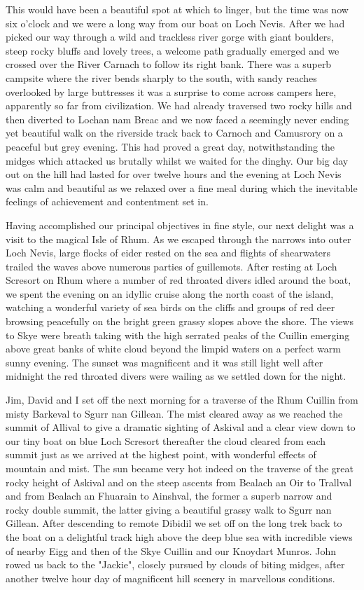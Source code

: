 \documentclass[a5paper,openany,font 10pt]{scrbook}
\begin{document}
This would have been a beautiful spot at which to linger,
but the time was now six o'clock and we were a long way from our
boat on Loch Nevis. After we had picked our way through a wild
and trackless river gorge with giant boulders, steep rocky bluffs
and lovely trees, a welcome path gradually emerged and we crossed
over the River Carnach to follow its right bank. There was a
superb campsite where the river bends sharply to the south, with
sandy reaches overlooked by large buttresses  it was a surprise
to come across campers here, apparently so far from civilization.
We had already traversed two rocky hills and then diverted to
Lochan nam Breac and we now faced a seemingly never ending yet
beautiful walk on the riverside track back to Carnoch and
Camusrory on a peaceful but grey evening. This had proved a great
day, notwithstanding the midges which attacked us brutally whilst
we waited for the dinghy. Our big day out on the hill had lasted
for over twelve hours and the evening at Loch Nevis was calm and
beautiful as we relaxed over a fine meal during which the
inevitable feelings of achievement and contentment set in.

Having accomplished our principal objectives in fine style,
our next delight was a visit to the magical Isle of Rhum. As we
escaped through the narrows into outer Loch Nevis, large flocks
of eider rested on the sea and flights of shearwaters trailed the
waves above numerous parties of guillemots. After resting at Loch
Scresort on Rhum where a number of red throated divers idled
around the boat, we spent the evening on an idyllic cruise along
the north coast of the island, watching a wonderful variety of
sea birds on the cliffs and groups of red deer browsing
peacefully on the bright green grassy slopes above the shore. The
views to Skye were breath taking with the high serrated peaks of
the Cuillin emerging above great banks of white cloud beyond the
limpid waters on a perfect warm sunny evening. The sunset was
magnificent and it was still light well after midnight
the red throated divers were wailing as we settled down for the night.

Jim, David and I set off the next morning for a traverse of
the Rhum Cuillin from misty Barkeval to Sgurr nan Gillean. The
mist cleared away as we reached the summit of Allival to give a
dramatic sighting of Askival and a clear view down to our tiny
boat on blue Loch Scresort  thereafter the cloud cleared from
each summit just as we arrived at the highest point, with
wonderful effects of mountain and mist. The sun became very hot
indeed on the traverse of the great rocky height of Askival and
on the steep ascents from Bealach an Oir to Trallval and from
Bealach an Fhuarain to Ainshval, the former a superb narrow and
rocky double summit, the latter giving a beautiful grassy walk to
Sgurr nan Gillean. After descending to remote Dibidil we set off
on the long trek back to the boat on a delightful track high
above the deep blue sea with incredible views of nearby Eigg and
then of the Skye Cuillin and our Knoydart Munros.  John rowed us
back to the "Jackie", closely pursued by clouds of biting midges,
after another twelve hour day of magnificent hill scenery in
marvellous conditions.
\end{document}
